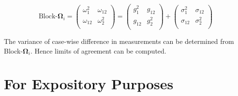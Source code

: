 \documentclass[12pt, a4paper]{report}
\theoremstyle{plain}
\theoremstyle{definition}
\theoremstyle{remark}
\begin{document}
\[ \textrm{Block-}\boldsymbol{\Omega}_{i}  = \left(\begin{array}{cc}
\omega^2_1  & \omega_{12} \\
\omega_{12} & \omega^2_2 \\
\end{array}  \right)
=  \left(
\begin{array}{cc}
g^2_1  & g_{12} \\
g_{12} & g^2_2 \\
\end{array} \right)+
\left(
\begin{array}{cc}
\sigma^2_1  & \sigma_{12} \\
\sigma_{12} & \sigma^2_2 \\
\end{array}\right)
\]

The variance of case-wise difference in measurements can be determined from Block-$\boldsymbol{\Omega}_{i}$. Hence limits of agreement can be computed.


\section{For Expository Purposes}
\end{document}
